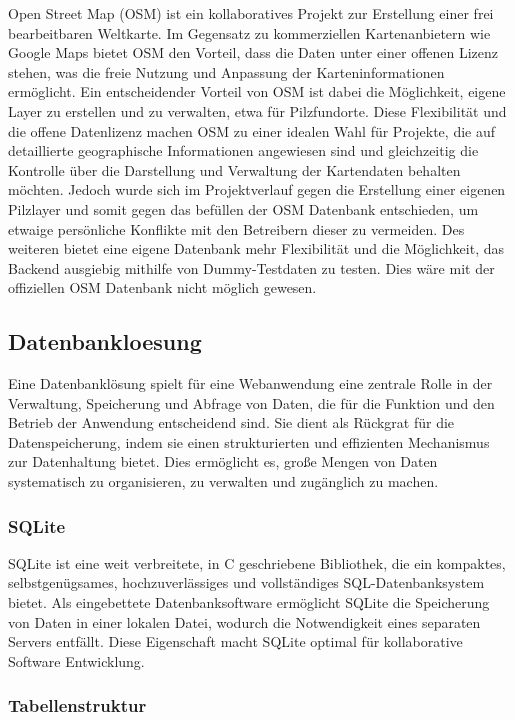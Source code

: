 \documentclass[../main.tex]{subfiles} %
\begin{document}
Open Street Map (OSM) ist ein kollaboratives Projekt zur Erstellung einer frei bearbeitbaren Weltkarte. Im Gegensatz zu kommerziellen
Kartenanbietern wie Google Maps bietet OSM den Vorteil, dass die Daten unter einer offenen Lizenz stehen, was die freie Nutzung und
Anpassung der Karteninformationen ermöglicht. Ein entscheidender Vorteil von OSM ist dabei die Möglichkeit, eigene Layer zu erstellen und
zu verwalten, etwa für Pilzfundorte. Diese Flexibilität und die offene Datenlizenz machen OSM zu einer idealen Wahl für Projekte, die auf
detaillierte geographische Informationen angewiesen sind und gleichzeitig die Kontrolle über die Darstellung und Verwaltung der Kartendaten
behalten möchten. Jedoch wurde sich im Projektverlauf gegen die Erstellung einer eigenen Pilzlayer und somit gegen das befüllen der OSM Datenbank
entschieden, um etwaige persönliche Konflikte mit den Betreibern dieser zu vermeiden. Des weiteren bietet eine eigene Datenbank mehr Flexibilität
und die Möglichkeit, das Backend ausgiebig mithilfe von Dummy-Testdaten zu testen. Dies wäre mit der offiziellen OSM Datenbank nicht möglich gewesen.

\subsection{Datenbankloesung} %

Eine Datenbanklösung spielt für eine Webanwendung eine zentrale Rolle in der Verwaltung, Speicherung und Abfrage von Daten, die für die Funktion und den Betrieb der Anwendung entscheidend sind. 
Sie dient als Rückgrat für die Datenspeicherung, indem sie einen strukturierten und effizienten Mechanismus zur Datenhaltung bietet. 
Dies ermöglicht es, große Mengen von Daten systematisch zu organisieren, zu verwalten und zugänglich zu machen.

\subsubsection{SQLite}

SQLite ist eine weit verbreitete, in C geschriebene Bibliothek, die ein kompaktes, selbstgenügsames, hochzuverlässiges und vollständiges SQL-Datenbanksystem bietet. 
Als eingebettete Datenbanksoftware ermöglicht SQLite die Speicherung von Daten in einer lokalen Datei, wodurch die Notwendigkeit eines separaten Servers entfällt.
Diese Eigenschaft macht SQLite optimal für kollaborative Software Entwicklung.

\subsubsection{Tabellenstruktur}
\end{document}
